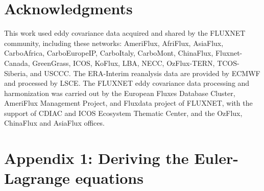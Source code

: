 \documentclass[utf8]{frontiersSCNS} %
\begin{document}
\section*{Acknowledgments}
This work used eddy covariance data acquired and shared by the FLUXNET community, including these networks: AmeriFlux, AfriFlux, AsiaFlux, CarboAfrica, CarboEuropeIP, CarboItaly, CarboMont, ChinaFlux, Fluxnet-Canada, GreenGrass, ICOS, KoFlux, LBA, NECC, OzFlux-TERN, TCOS-Siberia, and USCCC. The ERA-Interim reanalysis data are provided by ECMWF and processed by LSCE. The FLUXNET eddy covariance data processing and harmonization was carried out by the European Fluxes Database Cluster, AmeriFlux Management Project, and Fluxdata project of FLUXNET, with the support of CDIAC and ICOS Ecosystem Thematic Center, and the OzFlux, ChinaFlux and AsiaFlux offices.


\section*{Appendix 1: Deriving the Euler-Lagrange equations}
\end{document}
